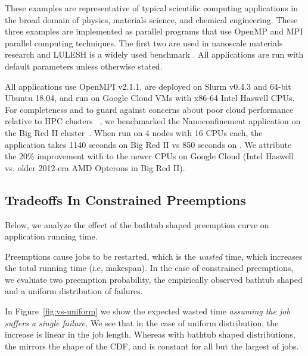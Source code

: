These examples are representative of typical scientific computing applications in the broad domain of physics, materials science, and chemical engineering. These three examples are implemented as parallel programs that use OpenMP and MPI parallel computing techniques. The first two are used in nanoscale materials research \cite{jso1,jso2,solis2013generating,jjzo1,jto1,jyto} and LULESH is a widely used benchmark \cite{IPDPS13:LULESH,LULESH2:changes}.
All applications are run with default parameters unless otherwise stated. 


All applications use OpenMPI v2.1.1, are deployed on Slurm v0.4.3 and 64-bit Ubuntu 18.04, and run on Google Cloud VMs with x86-64 Intel Haswell CPUs. 
For completeness and to guard against concerns about poor cloud performance relative to HPC clusters ~\cite{iosup_performance_2011, zhai_cloud_2011, marathe2013comparative, galante_analysis_2016, benedictis_cloud-aware_2014}, we benchmarked the Nanoconfinement application on the Big Red II cluster~\cite{bigred2}. 
When run on 4 nodes with 16 CPUs each, the application takes 1140 seconds on Big Red II vs 850 seconds on \sysname. 
We attribute the 20\% improvement with \sysname to the newer CPUs on Google Cloud (Intel Haswell vs. older 2012-era AMD Opterons in Big Red II).


\vspace*{\subsecspace}

\subsection{Tradeoffs In Constrained Preemptions}

Below, we analyze the effect of the bathtub shaped preemption curve on application running time. 


Preemptions cause jobs to be restarted, which is the \emph{wasted} time, which increases the total running time (i.e, makespan).
In the case of constrained preemptions, we evaluate two preemption probability, the empirically observed bathtub shaped and a uniform distribution of failures.


In Figure~\ref{fig:vs-uniform} we show the expected wasted time \emph{assuming the job suffers a single failure.}
We see that in the case of uniform distribution, the increase is linear in the job length.
Whereas with bathtub shaped distributions, the mirrors the shape of the CDF, and is constant for all but the largest of jobs. 


